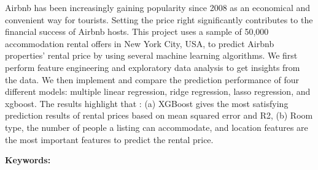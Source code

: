 
Airbnb has been increasingly gaining popularity since 2008 as an economical and
convenient way for tourists.  Setting the price right significantly contributes
to the financial success of Airbnb hosts. This project uses a sample of 50,000
accommodation rental offers in New York City, USA, to predict Airbnb properties'
rental price by using several machine learning algorithms.  We first perform
feature engineering and exploratory data analysis to get insights from the data.
We then implement and compare the prediction performance of four different
models: multiple linear regression, ridge regression, lasso regression, and
xgboost.  The results highlight that : (a) XGBoost gives the most satisfying
prediction results of rental prices based on mean squared error and R2, (b) Room
type, the number of people a listing can accommodate, and location features are
the most important features to predict the rental price.

\textbf{Keywords:}

